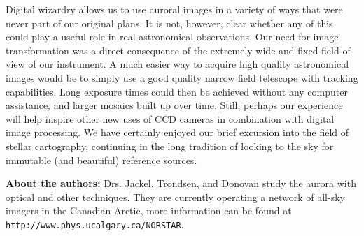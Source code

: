 \documentclass[11pt,twoside]{article}   %
\begin{document}
\begin{multicols}{2}

Digital wizardry allows us to use auroral images in a variety of
ways that were never part of our original plans.  It is not,
however, clear whether any of this could play a useful role in
real astronomical observations.  Our need for image transformation
was a direct consequence of the extremely wide and fixed field of
view of our instrument.  A much easier way to acquire high quality
astronomical images would be to simply use a good quality narrow
field telescope with tracking capabilities. Long exposure times
could then be achieved without any computer assistance, and larger
mosaics built up over time. Still, perhaps our experience will
help inspire other new uses of CCD cameras in combination with
digital image processing.  We have certainly enjoyed our brief
excursion into the field of stellar cartography, continuing in the
long tradition of looking to the sky for immutable (and beautiful)
reference sources.

{\bf About the authors:} Drs. Jackel, Trondsen, and Donovan study
the aurora with optical and other techniques.  They are currently
operating a network of all-sky imagers in the Canadian Arctic,
more information can be found at {\small\tt
http://www.phys.ucalgary.ca/NORSTAR}.

\end{multicols}
\end{document}
